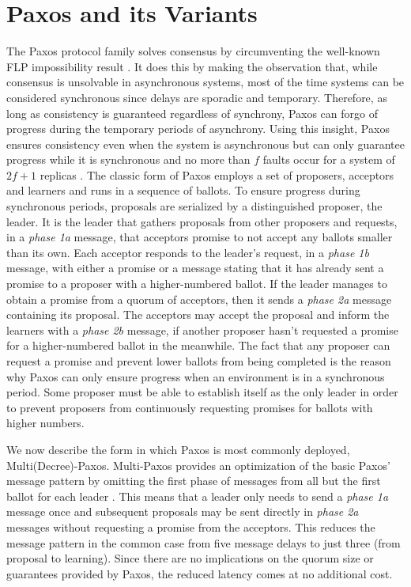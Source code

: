 \section{Paxos and its Variants} \label{Paxos} 
The Paxos protocol family solves consensus by circumventing the well-known FLP impossibility result \cite{Fischer1985}. It does this by making the observation that, while consensus is unsolvable in asynchronous systems, most of the time systems can be considered synchronous since delays are sporadic and temporary. Therefore, as long as consistency is guaranteed regardless of synchrony, Paxos can forgo of progress during the temporary periods of asynchrony. Using this insight, Paxos ensures consistency even when the system is asynchronous but can only guarantee progress while it is synchronous and no more than $f$ faults occur for a system of $2f+1$ replicas \cite{Lamport2001}. The classic form of Paxos employs a set of proposers, acceptors and learners and runs in a sequence of ballots. To ensure progress during synchronous periods, proposals are serialized by a distinguished proposer, the leader. It is the leader that gathers proposals from other proposers and requests, in a \textit{phase 1a} message, that acceptors promise to not accept any ballots smaller than its own. Each acceptor responds to the leader's request, in a \textit{phase 1b} message, with either a promise or a message stating that it has already sent a promise to a proposer with a higher-numbered ballot. If the leader manages to obtain a promise from a quorum of acceptors, then it sends a \textit{phase 2a} message containing its proposal. The acceptors may accept the proposal and inform the learners with a \textit{phase 2b} message, if another proposer hasn't requested a promise for a higher-numbered ballot in the meanwhile. The fact that any proposer can request a promise and prevent lower ballots from being completed is the reason why Paxos can only ensure progress when an environment is in a synchronous period. Some proposer must be able to establish itself as the only leader in order to prevent proposers from continuously requesting promises for ballots with higher numbers. \par
We now describe the form in which Paxos is most commonly deployed, Multi(Decree)-Paxos. Multi-Paxos provides an optimization of the basic Paxos' message pattern by omitting the first phase of messages from all but the first ballot for each leader \cite{Renesse2011}. This means that a leader only needs to send a \textit{phase 1a} message once and subsequent proposals may be sent directly in \textit{phase 2a} messages without requesting a promise from the acceptors. This reduces the message pattern in the common case from five message delays to just three (from proposal to learning). Since there are no implications on the quorum size or guarantees provided by Paxos, the reduced latency comes at no additional cost. \par
